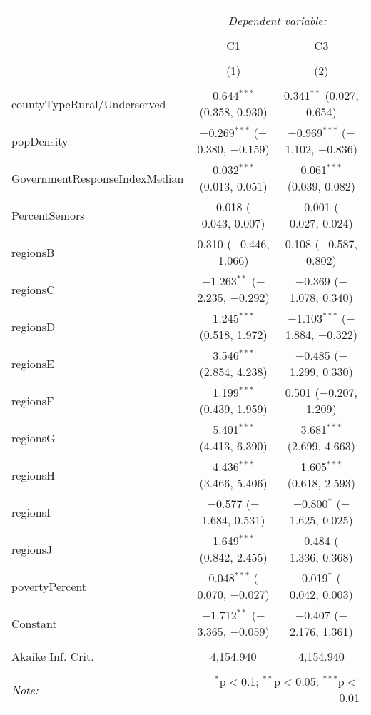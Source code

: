 
\begin{table}[!htbp] \centering 
  \caption{} 
  \label{} 
\begin{tabular}{@{\extracolsep{5pt}}lcc} 
\\[-1.8ex]\hline 
\hline \\[-1.8ex] 
 & \multicolumn{2}{c}{\textit{Dependent variable:}} \\ 
\cline{2-3} 
\\[-1.8ex] & C1 & C3 \\ 
\\[-1.8ex] & (1) & (2)\\ 
\hline \\[-1.8ex] 
 countyTypeRural/Underserved & 0.644$^{***}$ (0.358, 0.930) & 0.341$^{**}$ (0.027, 0.654) \\ 
  popDensity & $-$0.269$^{***}$ ($-$0.380, $-$0.159) & $-$0.969$^{***}$ ($-$1.102, $-$0.836) \\ 
  GovernmentResponseIndexMedian & 0.032$^{***}$ (0.013, 0.051) & 0.061$^{***}$ (0.039, 0.082) \\ 
  PercentSeniors & $-$0.018 ($-$0.043, 0.007) & $-$0.001 ($-$0.027, 0.024) \\ 
  regionsB & 0.310 ($-$0.446, 1.066) & 0.108 ($-$0.587, 0.802) \\ 
  regionsC & $-$1.263$^{**}$ ($-$2.235, $-$0.292) & $-$0.369 ($-$1.078, 0.340) \\ 
  regionsD & 1.245$^{***}$ (0.518, 1.972) & $-$1.103$^{***}$ ($-$1.884, $-$0.322) \\ 
  regionsE & 3.546$^{***}$ (2.854, 4.238) & $-$0.485 ($-$1.299, 0.330) \\ 
  regionsF & 1.199$^{***}$ (0.439, 1.959) & 0.501 ($-$0.207, 1.209) \\ 
  regionsG & 5.401$^{***}$ (4.413, 6.390) & 3.681$^{***}$ (2.699, 4.663) \\ 
  regionsH & 4.436$^{***}$ (3.466, 5.406) & 1.605$^{***}$ (0.618, 2.593) \\ 
  regionsI & $-$0.577 ($-$1.684, 0.531) & $-$0.800$^{*}$ ($-$1.625, 0.025) \\ 
  regionsJ & 1.649$^{***}$ (0.842, 2.455) & $-$0.484 ($-$1.336, 0.368) \\ 
  povertyPercent & $-$0.048$^{***}$ ($-$0.070, $-$0.027) & $-$0.019$^{*}$ ($-$0.042, 0.003) \\ 
  Constant & $-$1.712$^{**}$ ($-$3.365, $-$0.059) & $-$0.407 ($-$2.176, 1.361) \\ 
 \hline \\[-1.8ex] 
Akaike Inf. Crit. & 4,154.940 & 4,154.940 \\ 
\hline 
\hline \\[-1.8ex] 
\textit{Note:}  & \multicolumn{2}{r}{$^{*}$p$<$0.1; $^{**}$p$<$0.05; $^{***}$p$<$0.01} \\ 
\end{tabular} 
\end{table} 
